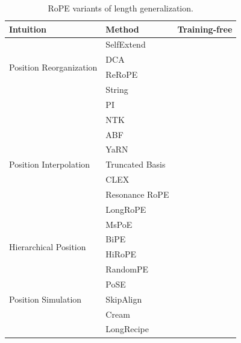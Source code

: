 \documentclass[11pt, a4paper, logo, copyright, nonumbering]{map}
\newcommand{\Checkmark}{\ding{51}} %
\newcommand{\XSolidBrush}{\ding{55}} %
\begin{document}
\begin{table}[t!]
\centering
\footnotesize
\renewcommand{\arraystretch}{1.1}
\setlength\tabcolsep{30pt}
\begin{tabular}{llc}
\toprule
\textbf{Intuition} & \textbf{Method}  & \textbf{Training-free} \\
\midrule
\multirow{4}{*}{Position Reorganization} & SelfExtend \cite{jin2024llm} & \Checkmark           \\
& DCA \cite{an2024training}             & \Checkmark                     \\
& ReRoPE \cite{kexuefm-9708}          & \Checkmark                         \\
& String \cite{an2024does}          & \Checkmark              \\ 
\midrule
\multirow{9}{*}{Position Interpolation} & PI \cite{chen2023extending}               & \Checkmark          \\
& NTK \cite{peng2023yarn}             & \Checkmark             \\
& ABF \cite{xiong2023effective}             & \Checkmark         \\
& YaRN \cite{peng2023yarn}            & \Checkmark                         \\
& Truncated Basis \cite{pal2023giraffe}  & \Checkmark                         \\
& CLEX  \cite{chen2023clex}           & \XSolidBrush                       \\
& Resonance RoPE \cite{wang2024resonance}            & \XSolidBrush                         \\
& LongRoPE \cite{ding2024longrope}        & \XSolidBrush                       \\
& MsPoE \cite{zhang2024found}          & \Checkmark                        \\
\midrule
\multirow{2}{*}{Hierarchical Position} & BiPE \cite{he2024two}            & \XSolidBrush                       \\
& HiRoPE~\citep{zhang2024hirope} & \Checkmark                      \\   
\midrule
\multirow{5}{*}{Position Simulation} & RandomPE \cite{ruoss2023randomized}         & \XSolidBrush              \\
& PoSE \cite{zhu2023pose}            & \XSolidBrush                    \\
& SkipAlign \cite{wu2024long}            & \XSolidBrush                     \\
& Cream \cite{wuefficient}            & \XSolidBrush                      \\
& LongRecipe~\citep{hu2024longrecipe} & \XSolidBrush                      \\
\bottomrule
\end{tabular}
\caption{RoPE variants of length generalization.}
\label{tab:extrapolation}
\end{table}
\end{document}
